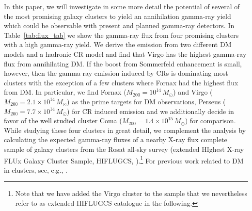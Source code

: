 \documentclass[10pt,aps,pra,reprint,amsmath,amsfonts,amssymb,showpacs,nofootinbib,floatfix]{revtex4-1}
\def\del#1{{}}
\newcommand{\msun}{M_\odot}
\newcommand{\mvir}{M_{200}}
\begin{document}
In this paper, we will investigate in some more detail the potential
of several of the most promising galaxy clusters to yield an
annihilation gamma-ray yield which could be observable with present
and planned gamma-ray detectors. In Table~\ref{tab:flux_tab} we show
the gamma-ray flux from four promising clusters with a high gamma-ray
yield. We derive the emission from two different DM models and a
hadronic CR model and find that Virgo has the highest gamma-ray flux
from annihilating DM. If the boost from Sommerfeld enhancement is
small, however, then the gamma-ray emission induced by CRs is
dominating most clusters with the exception of a few clusters where
Fornax had the highest flux from DM. In particular, we find Fornax
($\mvir=10^{14}\,\msun$) and Virgo ($\mvir=2.1\times10^{14}\,\msun$)
\del{\cite{}} as the prime targets for DM observations, Perseus
($\mvir=7.7\times10^{14}\,\msun$) for CR induced emission and we
additionally decide in favor of the well studied cluster Coma
($\mvir=1.4\times10^{15}\,\msun$) for comparison. While studying these
four clusters in great detail, we complement the analysis by
calculating the expected gamma-ray fluxes of a nearby X-ray flux
complete sample of galaxy clusters from the Rosat all-sky survey
(extended HIghest X-ray FLUx Galaxy Cluster Sample, HIFLUGCS,
\citealt{2002ApJ...567..716R}).\footnote{Note that we have added the
  Virgo cluster to the sample that we nevertheless refer to as
  extended HIFLUGCS catalogue in the following.}  For previous work
related to DM in clusters, see, e.g.,
\cite{2006A&A...455...21C,2009PhRvD..80b3005J}.
\end{document}

